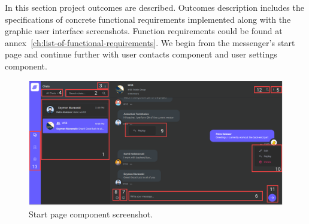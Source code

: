In this section project outcomes are described.
Outcomes description includes the specifications of concrete functional requirements implemented along with the
graphic user interface screenshots.
Function requirements could be found at annex~\ref{ch:list-of-functional-requirements}.
We begin from the messenger's start page and continue further with user contacts component and user settings component.
\begin{figure}[H]
    \centering
    \includegraphics[width=1\textwidth]{Pictures/09_Messenger_startpage}
    \caption{Start page component screenshot.}\label{fig:figure5}
\end{figure}

